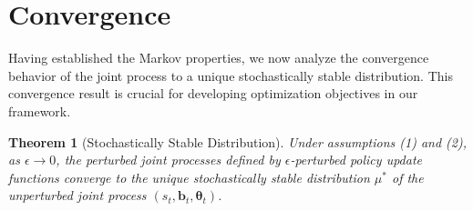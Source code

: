 \documentclass[a4paper,12pt]{report}
\newtheorem{theorem}{Theorem}
\begin{document}
\section{Convergence}
Having established the Markov properties, we now analyze the convergence
behavior of the joint process to a unique stochastically stable distribution. This
convergence result is crucial for developing optimization objectives in our framework.
\begin{theorem}[Stochastically Stable Distribution]
    Under assumptions (1) and (2), as $\epsilon \to 0$, the perturbed joint processes
    defined by $\epsilon$-perturbed policy update functions converge to the unique
    stochastically stable distribution $\mu^{*}$ of the unperturbed joint process $(
        s_{t}, \boldsymbol{b}_{t}, \boldsymbol{\theta}_{t})$.
\end{theorem}
\end{document}
